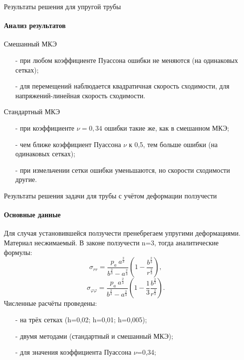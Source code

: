 \documentclass{beamer}
\begin{document}
\begin{frame}{Результаты решения для упругой трубы}
\framesubtitle{Анализ результатов}
\small
\begin{block}{Смешанный МКЭ}
\begin{itemize}
\item[-]при любом коэффициенте Пуассона ошибки не меняются (на одинаковых сетках);
\smallskip
\item[-]для перемещений наблюдается квадратичная скорость сходимости, для напряжений-линейная скорость сходимости.
\end{itemize}
\end{block}
\medskip

\begin{block}{Стандартный МКЭ}
\begin{itemize}
\item[-]при коэффициенте $\nu=0,34$ ошибки такие же, как в смешанном МКЭ;
\smallskip
\item[-]чем ближе коэффициент Пуассона $\nu$ к 0,5, тем больше ошибки (на одинаковых сетках);
\smallskip
\item[-]при измельчении сетки ошибки уменьшаются, но скорости сходимости другие.
\end{itemize}
\end{block}

\end{frame}

\begin{frame}{Результаты решения задачи для трубы с учётом деформации ползучести}
\framesubtitle{Основные данные}
\small
Для случая установившейся ползучести пренебрегаем упругими деформациями. Материал несжимаемый. В законе ползучести n=3, тогда аналитические формулы:
\begin{equation*}
\sigma_{rr}=\frac{p_a\: a^{\tfrac{2}{3}}}{b^{\tfrac{2}{3}}-a^{\tfrac{2}{3}}}\left(1-\frac{b^{\tfrac{2}{3}}}{r^{\tfrac{2}{3}}}\right),
\end{equation*}
\begin{equation*}
\sigma_{\varphi\varphi}=\dfrac{p_a\: a^{\tfrac{2}{3}}}{b^{\tfrac{2}{3}}-a^{\tfrac{2}{3}}}\left(1-\frac{1}{3}\frac{b^{\tfrac{2}{3}}}{r^{\tfrac{2}{3}}}\right).
\end{equation*}
Численные расчёты проведены:
\smallskip
\begin{itemize}
\item[-]на трёх сетках (h=0,02; h=0,01; h=0,005);
\smallskip
\item[-]двумя методами (стандартный и смешанный МКЭ);
\smallskip
\item[-]для значения коэффициента Пуассона $\nu$=0,34;
\end{itemize}

\end{frame}
\end{document}
